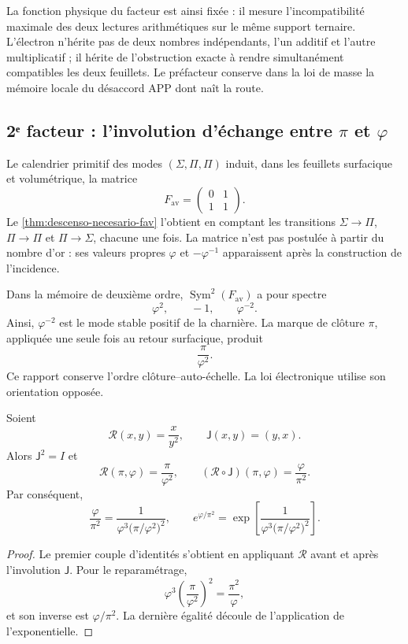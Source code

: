 La fonction physique du facteur est ainsi fixée : il mesure l'incompatibilité
maximale des deux lectures arithmétiques sur le même support ternaire.
L'électron n'hérite pas de deux nombres indépendants, l'un additif et l'autre
multiplicatif ; il hérite de l'obstruction exacte à rendre simultanément
compatibles les deux feuillets. Le préfacteur conserve dans la loi de masse la
mémoire locale du désaccord APP dont naît la route.

\subsection{2ᵉ facteur : l'involution d'échange entre \(\pi\) et \(\varphi\)}

Le calendrier primitif des modes
\((\Sigma,\Pi,\Pi)\) induit, dans les feuillets surfacique et volumétrique, la matrice
\[
 F_{\mathrm{av}}
 =
 \begin{pmatrix}
 0&1\\
 1&1
 \end{pmatrix}.
\]
Le \cref{thm:descenso-necesario-fav} l'obtient en comptant les transitions
\(\Sigma\to\Pi\), \(\Pi\to\Pi\) et \(\Pi\to\Sigma\), chacune une fois.
La matrice n'est pas postulée à partir du nombre d'or : ses valeurs propres
\(\varphi\) et \(-\varphi^{-1}\) apparaissent après la construction de
l'incidence.

Dans la mémoire de deuxième ordre,
\(\operatorname{Sym}^2(F_{\mathrm{av}})\) a pour spectre
\[
 \varphi^2,\qquad -1,\qquad\varphi^{-2}.
\]
Ainsi, \(\varphi^{-2}\) est le mode stable positif de la charnière. La marque
de clôture \(\pi\), appliquée une seule fois au retour surfacique, produit
\[
 \frac{\pi}{\varphi^2}.
\]
Ce rapport conserve l'ordre clôture--auto-échelle. La loi électronique utilise son
orientation opposée.

\begin{theorem}
\label{thm:espejo-electron-rev6}
Soient
\[
 \mathscr R(x,y)=\frac{x}{y^2},
 \qquad
 \mathsf J(x,y)=(y,x).
\]
Alors \(\mathsf J^2=I\) et
\[
 \mathscr R(\pi,\varphi)=\frac{\pi}{\varphi^2},
 \qquad
 (\mathscr R\circ\mathsf J)(\pi,\varphi)
 =\frac{\varphi}{\pi^2}.
\]
Par conséquent,
\[
 \frac{\varphi}{\pi^2}
 =
 \frac{1}{
 \varphi^3\bigl(\pi/\varphi^2\bigr)^2},
 \qquad
 e^{\varphi/\pi^2}
 =
 \exp\!\left[
 \frac{1}{
 \varphi^3\bigl(\pi/\varphi^2\bigr)^2}
 \right].
\]
\end{theorem}

\begin{proof}
Le premier couple d'identités s'obtient en appliquant
\(\mathscr R\) avant et après l'involution \(\mathsf J\). Pour le
reparamétrage,
\[
 \varphi^3
 \left(\frac{\pi}{\varphi^2}\right)^2
 =\frac{\pi^2}{\varphi},
\]
et son inverse est \(\varphi/\pi^2\). La dernière égalité découle de l'application de
l'exponentielle.
\end{proof}

